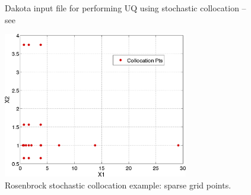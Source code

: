 \begin{figure}[htbp!]
  \centering
  \begin{bigbox}
    \begin{small}
    \end{small}
  \end{bigbox}
\caption{Dakota input file for performing UQ using stochastic collocation --
see \protect{} }
\label{uq:figure11}
\end{figure}

\begin{figure}[htbp!]
  \centering
  \includegraphics[height=2.5in]{images/rosen_sc_pts}
  \caption{Rosenbrock stochastic collocation example: sparse grid points.}
  \label{uq:figure11b}
\end{figure}


